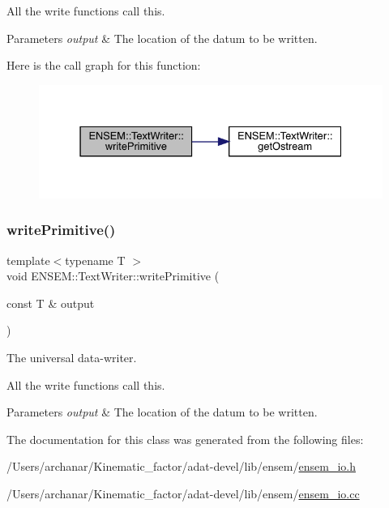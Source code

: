 All the write functions call this. 
\begin{DoxyParams}{Parameters}
{\em output} & The location of the datum to be written. \\
\hline
\end{DoxyParams}
Here is the call graph for this function\+:
\nopagebreak
\begin{figure}[H]
\begin{center}
\leavevmode
\includegraphics[width=331pt]{db/d53/classENSEM_1_1TextWriter_aca159ff3db64ed918f7e4ddfed7a6d53_cgraph}
\end{center}
\end{figure}
\mbox{\label{classENSEM_1_1TextWriter_aca159ff3db64ed918f7e4ddfed7a6d53}} 
\subsubsection{\texorpdfstring{writePrimitive()}{writePrimitive()}\hspace{0.1cm}{\footnotesize\ttfamily [3/3]}}
{\footnotesize\ttfamily template$<$typename T $>$ \\
void E\+N\+S\+E\+M\+::\+Text\+Writer\+::write\+Primitive (\begin{DoxyParamCaption}\item[{const T \&}]{output }\end{DoxyParamCaption})\hspace{0.3cm}{\ttfamily [protected]}}



The universal data-\/writer. 

All the write functions call this. 
\begin{DoxyParams}{Parameters}
{\em output} & The location of the datum to be written. \\
\hline
\end{DoxyParams}


The documentation for this class was generated from the following files\+:\begin{DoxyCompactItemize}
\item 
/\+Users/archanar/\+Kinematic\+\_\+factor/adat-\/devel/lib/ensem/\mbox{\hyperlink{adat-devel_2lib_2ensem_2ensem__io_8h}{ensem\+\_\+io.\+h}}\item 
/\+Users/archanar/\+Kinematic\+\_\+factor/adat-\/devel/lib/ensem/\mbox{\hyperlink{adat-devel_2lib_2ensem_2ensem__io_8cc}{ensem\+\_\+io.\+cc}}\end{DoxyCompactItemize}
